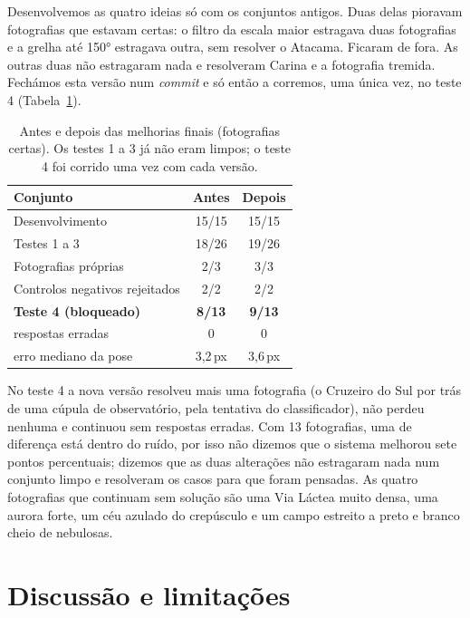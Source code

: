 \documentclass[11pt,a4paper]{article}
\begin{document}
Desenvolvemos as quatro ideias só com os conjuntos antigos. Duas delas
pioravam fotografias que estavam certas: o filtro da escala maior estragava
duas fotografias e a grelha até 150° estragava outra, sem resolver o Atacama.
Ficaram de fora. As outras duas não estragaram nada e resolveram Carina e a
fotografia tremida. Fechámos esta versão num \emph{commit} e só então a
corremos, uma única vez, no teste 4 (Tabela~\ref{tab:teste4}).

\begin{table}[H]
  \centering
  \caption{Antes e depois das melhorias finais (fotografias certas). Os testes
  1 a 3 já não eram limpos; o teste 4 foi corrido uma vez com cada versão.}
  \label{tab:teste4}
  \begin{tabular}{@{}lcc@{}}
    \toprule
    Conjunto & Antes & Depois \\
    \midrule
    Desenvolvimento & 15/15 & 15/15 \\
    Testes 1 a 3 & 18/26 & 19/26 \\
    Fotografias próprias & 2/3 & 3/3 \\
    Controlos negativos rejeitados & 2/2 & 2/2 \\
    \midrule
    \textbf{Teste 4 (bloqueado)} & \textbf{8/13} & \textbf{9/13} \\
    \quad respostas erradas & 0 & 0 \\
    \quad erro mediano da pose & 3,2\,px & 3,6\,px \\
    \bottomrule
  \end{tabular}
\end{table}

No teste 4 a nova versão resolveu mais uma fotografia (o Cruzeiro do Sul por
trás de uma cúpula de observatório, pela tentativa do classificador), não
perdeu nenhuma e continuou sem respostas erradas. Com 13 fotografias, uma de
diferença está dentro do ruído, por isso não dizemos que o sistema melhorou
sete pontos percentuais; dizemos que as duas alterações não estragaram nada
num conjunto limpo e resolveram os casos para que foram pensadas. As quatro
fotografias que continuam sem solução são uma Via Láctea muito densa, uma
aurora forte, um céu azulado do crepúsculo e um campo estreito a preto e
branco cheio de nebulosas.

\section{Discussão e limitações}
\end{document}
